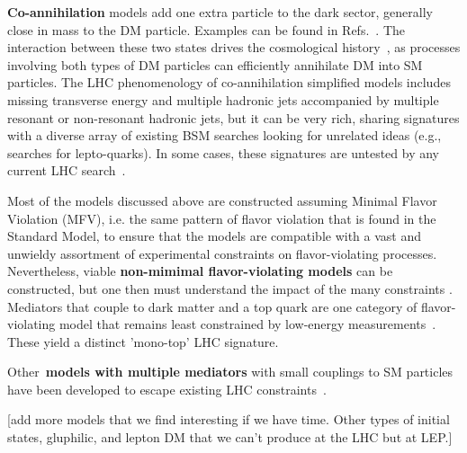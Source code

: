 \textbf{Co-annihilation} models add one extra particle to the dark sector, generally close in mass to the DM particle. Examples can be found in Refs.~\cite{Buschmann:2016hkc,Baker:2015qna,Khoze:2017ixx}. The interaction between these two states drives the cosmological history~\cite{Ellis:1999mm,PlehnLecturesDM}, as processes involving both types of DM particles can efficiently annihilate DM into SM particles. The LHC phenomenology of co-annihilation simplified models includes missing transverse energy and multiple hadronic jets accompanied by multiple resonant or non-resonant hadronic jets, but it can be very rich, sharing signatures with a diverse array of existing BSM searches looking for unrelated ideas (e.g., searches for lepto-quarks). In some cases, these signatures are untested by any current LHC search~\cite{Buschmann:2016hkc}. 

Most of the models discussed above are constructed assuming Minimal Flavor Violation (MFV), i.e. the same pattern of flavor violation that is found in the Standard Model, to ensure that the models are compatible with a vast and unwieldy assortment of experimental constraints on flavor-violating processes. Nevertheless, viable \textbf{non-mimimal flavor-violating models} can be constructed, but one then must understand the impact of the many constraints \cite{Blanke:2017tnb}. Mediators that couple to dark matter and a top quark are one category of flavor-violating model that remains least constrained by low-energy measurements~\cite{DHondt:2015nat}. These yield a distinct 'mono-top' LHC signature. 

Other~\textbf{models with multiple mediators} with small couplings to SM particles have been developed to escape existing LHC constraints~\cite{Duerr:2016tmh}. 

[add more models that we find interesting if we have time. Other types of initial states, gluphilic, and lepton DM that we can't produce at the LHC but at LEP.]



